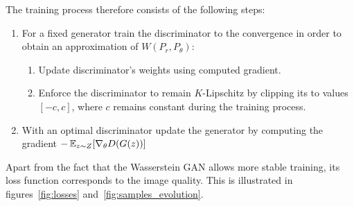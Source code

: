 The training process therefore consists of the following steps:
\begin{enumerate}
	\item For a fixed generator train the discriminator to the convergence in order to obtain an approximation of $W(P_r, P_\theta)$:
	\begin{enumerate}
		\item Update discriminator's weights using computed gradient.
		\item Enforce the discriminator to remain $K$-Lipschitz by clipping its to values $[-c, c]$, where $c$ remains constant during the training process.
	\end{enumerate}	
	\item With an optimal discriminator update the generator by computing the gradient $- \operatorname{\mathbb{E}}_{z \sim Z} [\nabla_\theta D(G(z))]$	
\end{enumerate}

Apart from the fact that the Wasserstein GAN allows more stable training, its loss function corresponds to the image quality. This is illustrated in figures~\ref{fig:losses} and~\ref{fig:samples_evolution}.

